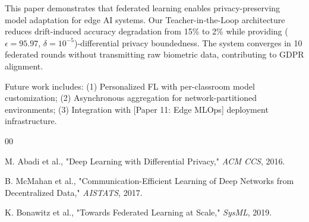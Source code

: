 \documentclass[conference]{IEEEtran}
\begin{document}
This paper demonstrates that federated learning enables privacy-preserving model adaptation for edge AI systems. Our Teacher-in-the-Loop architecture reduces drift-induced accuracy degradation from 15\% to 2\% while providing ($\epsilon=95.97$, $\delta=10^{-5}$)-differential privacy boundedness. The system converges in 10 federated rounds without transmitting raw biometric data, contributing to GDPR alignment.

Future work includes: (1) Personalized FL with per-classroom model customization; (2) Asynchronous aggregation for network-partitioned environments; (3) Integration with [Paper 11: Edge MLOps] deployment infrastructure.

\begin{thebibliography}{00}

 M. Abadi et al., "Deep Learning with Differential Privacy," \textit{ACM CCS}, 2016.

 B. McMahan et al., "Communication-Efficient Learning of Deep Networks from Decentralized Data," \textit{AISTATS}, 2017.

 K. Bonawitz et al., "Towards Federated Learning at Scale," \textit{SysML}, 2019.


\end{thebibliography}
\end{document}
